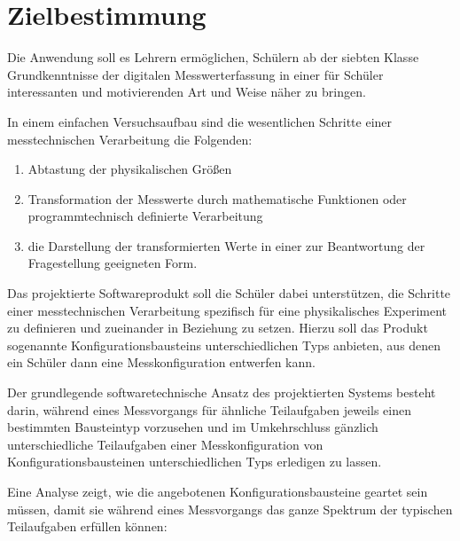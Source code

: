 \documentclass[parskip=full]{scrartcl}
\begin{document}
\clearpage
\section{Zielbestimmung}\label{zielbestimmung}

Die Anwendung soll es Lehrern ermöglichen, Schülern ab der siebten Klasse Grundkenntnisse der digitalen Messwerterfassung in einer für Schüler interessanten und motivierenden Art und Weise näher zu bringen. 

In einem einfachen Versuchsaufbau sind die wesentlichen Schritte einer messtechnischen Verarbeitung die Folgenden: 

\begin{enumerate}
	\item Abtastung der physikalischen Größen
	
	\item Transformation der Messwerte durch mathematische Funktionen oder programmtechnisch definierte Verarbeitung
	
	\item die Darstellung der transformierten Werte in einer zur Beantwortung der Fragestellung geeigneten Form.
	
\end{enumerate}

Das projektierte Softwareprodukt soll die Schüler dabei unterstützen, die Schritte einer messtechnischen Verarbeitung spezifisch für eine physikalisches Experiment zu definieren und zueinander in Beziehung zu setzen. Hierzu soll das Produkt sogenannte \glspl{Konfigurationsbaustein} unterschiedlichen Typs anbieten, aus denen ein Schüler dann eine Messkonfiguration entwerfen kann. 

 Der grundlegende softwaretechnische Ansatz des projektierten Systems besteht darin, während eines Messvorgangs für ähnliche Teilaufgaben jeweils einen bestimmten Bausteintyp vorzusehen und im Umkehrschluss gänzlich unterschiedliche Teilaufgaben einer Messkonfiguration von Konfigurationsbausteinen unterschiedlichen Typs erledigen zu lassen.
 
  Eine Analyse zeigt, wie die angebotenen Konfigurationsbausteine geartet sein müssen, damit sie während eines Messvorgangs das ganze Spektrum der typischen Teilaufgaben erfüllen können:
\end{document}
